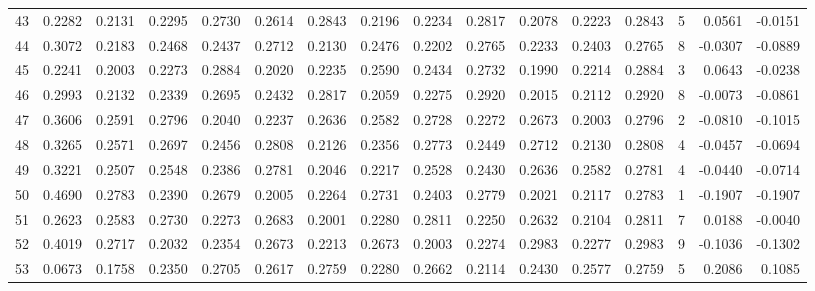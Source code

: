 \begin{tabular}{lrrrrrrrrrrrrrrr}
43  &      0.2282 &  0.2131 &  0.2295 &  0.2730 &  0.2614 &  0.2843 &  0.2196 &  0.2234 &  0.2817 &  0.2078 &   0.2223 &     0.2843 &      5 &                    0.0561 &                    -0.0151 \\
44  &      0.3072 &  0.2183 &  0.2468 &  0.2437 &  0.2712 &  0.2130 &  0.2476 &  0.2202 &  0.2765 &  0.2233 &   0.2403 &     0.2765 &      8 &                   -0.0307 &                    -0.0889 \\
45  &      0.2241 &  0.2003 &  0.2273 &  0.2884 &  0.2020 &  0.2235 &  0.2590 &  0.2434 &  0.2732 &  0.1990 &   0.2214 &     0.2884 &      3 &                    0.0643 &                    -0.0238 \\
46  &      0.2993 &  0.2132 &  0.2339 &  0.2695 &  0.2432 &  0.2817 &  0.2059 &  0.2275 &  0.2920 &  0.2015 &   0.2112 &     0.2920 &      8 &                   -0.0073 &                    -0.0861 \\
47  &      0.3606 &  0.2591 &  0.2796 &  0.2040 &  0.2237 &  0.2636 &  0.2582 &  0.2728 &  0.2272 &  0.2673 &   0.2003 &     0.2796 &      2 &                   -0.0810 &                    -0.1015 \\
48  &      0.3265 &  0.2571 &  0.2697 &  0.2456 &  0.2808 &  0.2126 &  0.2356 &  0.2773 &  0.2449 &  0.2712 &   0.2130 &     0.2808 &      4 &                   -0.0457 &                    -0.0694 \\
49  &      0.3221 &  0.2507 &  0.2548 &  0.2386 &  0.2781 &  0.2046 &  0.2217 &  0.2528 &  0.2430 &  0.2636 &   0.2582 &     0.2781 &      4 &                   -0.0440 &                    -0.0714 \\
50  &      0.4690 &  0.2783 &  0.2390 &  0.2679 &  0.2005 &  0.2264 &  0.2731 &  0.2403 &  0.2779 &  0.2021 &   0.2117 &     0.2783 &      1 &                   -0.1907 &                    -0.1907 \\
51  &      0.2623 &  0.2583 &  0.2730 &  0.2273 &  0.2683 &  0.2001 &  0.2280 &  0.2811 &  0.2250 &  0.2632 &   0.2104 &     0.2811 &      7 &                    0.0188 &                    -0.0040 \\
52  &      0.4019 &  0.2717 &  0.2032 &  0.2354 &  0.2673 &  0.2213 &  0.2673 &  0.2003 &  0.2274 &  0.2983 &   0.2277 &     0.2983 &      9 &                   -0.1036 &                    -0.1302 \\
53  &      0.0673 &  0.1758 &  0.2350 &  0.2705 &  0.2617 &  0.2759 &  0.2280 &  0.2662 &  0.2114 &  0.2430 &   0.2577 &     0.2759 &      5 &                    0.2086 &                     0.1085 \\

\end{tabular}
